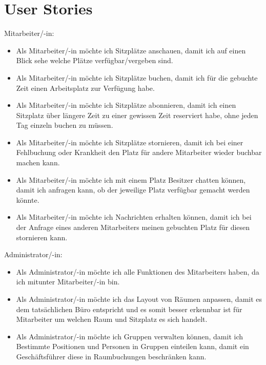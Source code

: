 \chapter{User Stories}

Mitarbeiter/-in:

\begin{itemize}
    \item Als Mitarbeiter/-in möchte ich Sitzplätze anschauen, damit ich auf einen Blick sehe welche Plätze verfügbar/vergeben sind.

    \item Als Mitarbeiter/-in möchte ich Sitzplätze buchen, damit ich für die gebuchte Zeit einen Arbeitsplatz zur Verfügung habe.

    \item Als Mitarbeiter/-in möchte ich Sitzplätze abonnieren, damit ich einen Sitzplatz über längere Zeit zu einer gewissen Zeit reserviert habe, ohne jeden Tag einzeln buchen zu müssen.

    \item Als Mitarbeiter/-in möchte ich Sitzplätze stornieren, damit ich bei einer Fehlbuchung oder Krankheit den Platz für andere Mitarbeiter wieder buchbar machen kann.

    \item Als Mitarbeiter/-in möchte ich mit einem Platz Besitzer chatten können, damit ich anfragen kann, ob der jeweilige Platz verfügbar gemacht werden könnte.

    \item Als Mitarbeiter/-in möchte ich Nachrichten erhalten können, damit ich bei der Anfrage eines anderen Mitarbeiters meinen gebuchten Platz für diesen stornieren kann.
\end{itemize}

\noindent Administrator/-in:

\begin{itemize}
    \item Als Administrator/-in möchte ich alle Funktionen des Mitarbeiters haben, da ich mitunter Mitarbeiter/-in bin.

    \item Als Administrator/-in möchte ich das Layout von Räumen anpassen, damit es dem tatsächlichen Büro entspricht und es somit besser erkennbar ist für Mitarbeiter um welchen Raum und Sitzplatz es sich handelt.

    \item Als Administrator/-in möchte ich Gruppen verwalten können, damit ich Bestimmte Positionen und Personen in Gruppen einteilen kann, damit ein Geschäftsführer diese in Raumbuchungen beschränken kann.
\end{itemize}

